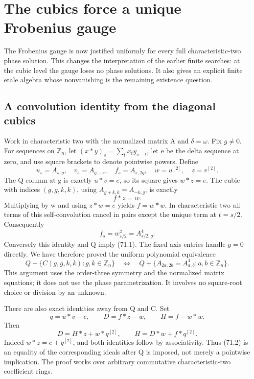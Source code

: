 \documentclass[11pt,reqno]{amsart}
\theoremstyle{plain}
\begin{document}
\section{The cubics force a unique Frobenius gauge}\label{sec:71}

The Frobenius gauge is now justified uniformly for every full
characteristic-two phase solution. This changes the interpretation
of the earlier finite searches: at the cubic level the gauge loses
no phase solutions. It also gives an explicit finite etale algebra
whose nonvanishing is the remaining existence question.

\subsection{A convolution identity from the diagonal cubics}\label{sec:71.1}

Work in characteristic two with the normalized matrix A and
\(\delta=\omega\). Fix \(g\ne0\). For sequences on
\(\mathbb Z_n\), let
\((x*y)_s=\sum_t x_t y_{s-t}\), let e be the delta sequence
at zero, and use square brackets to denote pointwise powers.
Define
\[
 u_s=A_{s,g},\quad v_s=A_{g,-s},\quad
 f_s=A_{s,2g},\quad w=u^{[2]},\quad z=v^{[2]}.
\]
The Q column at g is exactly \(u*v=e\), so its square gives
\(w*z=e\). The cubic with indices \((g,g,k,k)\), using
\(A_{g+k,k}=A_{-k,g}\), is exactly
\begin{equation*}
 f*z=w. \tag{71.1}
\end{equation*}
Multiplying by w and using \(z*w=e\) yields \(f=w*w\).
In characteristic two all terms of this self-convolution cancel
in pairs except the unique term at \(t=s/2\). Consequently
\[
 f_s=w_{s/2}^2=A_{s/2,g}^4.
\]
Conversely this identity and Q imply (71.1). The fixed axis entries
handle \(g=0\) directly. We have therefore proved the uniform
polynomial equivalence
\begin{equation*}
 \boxed{\displaystyle
 Q+\{C(g,g,k,k):g,k\in\mathbb Z_n\}
 \quad\Longleftrightarrow\quad
 Q+\{A_{2a,2b}=A_{a,b}^4:a,b\in\mathbb Z_n\}.}
 \tag{71.2}
\end{equation*}
This argument uses the order-three symmetry and the normalized
matrix equations; it does not use the phase parametrization.
It involves no square-root choice or division by an unknown.

There are also exact identities away from Q and C. Set
\[
 q=u*v-e,\qquad D=f*z-w,\qquad H=f-w*w.
\]
Then
\begin{equation*}
 \boxed{\displaystyle
 D=H*z+w*q^{[2]},\qquad
 H=D*w+f*q^{[2]}.}
 \tag{71.3}
\end{equation*}
Indeed \(w*z=e+q^{[2]}\), and both identities follow by
associativity. Thus (71.2) is an equality of the corresponding
ideals after Q is imposed, not merely a pointwise implication.
The proof works over arbitrary commutative characteristic-two
coefficient rings.
\end{document}
